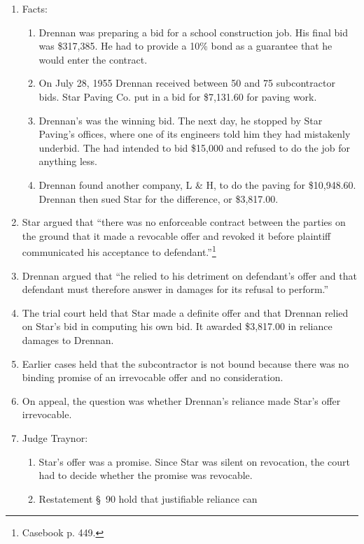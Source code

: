 \begin{enumerate}
    \item Facts:
    \begin{enumerate}
        \item Drennan was preparing a bid for a school construction job. His 
        final bid was \$317,385. He had to provide a 10\% bond as a guarantee 
        that he would enter the contract.
        \item On July 28, 1955 Drennan received between 50 and 75 
        subcontractor bids. Star Paving Co. put in a bid for \$7,131.60 for 
        paving work.
        \item Drennan's was the winning bid. The next day, he stopped by Star 
        Paving's offices, where one of its engineers told him they had 
        mistakenly underbid. The had intended to bid \$15,000 and refused to 
        do the job for anything less.
        \item Drennan found another company, L \& H, to do the paving for 
        \$10,948.60. Drennan then sued Star for the difference, or \$3,817.00.
    \end{enumerate}
    \item Star argued that ``there was no enforceable contract between the 
    parties on the ground that it made a revocable offer and revoked it before 
    plaintiff communicated his acceptance to defendant.''\footnote{Casebook p. 
    449.}
    \item Drennan argued that ``he relied to his detriment on defendant's 
    offer and that defendant must therefore answer in damages for its refusal 
    to perform.''
    \item The trial court held that Star made a definite offer and that 
    Drennan relied on Star's bid in computing his own bid. It awarded 
    \$3,817.00 in reliance damages to Drennan.
    \item Earlier cases held that the subcontractor is not bound because there 
    was no binding promise of an irrevocable offer and no consideration.
    \item On appeal, the question was whether Drennan's reliance made Star's 
    offer irrevocable.
    \item Judge Traynor:
    \begin{enumerate}
        \item Star's offer was a promise. Since Star was silent on revocation, 
        the court had to decide whether the promise was revocable.
        \item Restatement \S\ 90 hold that justifiable reliance can 

\end{enumerate}
\end{enumerate}
